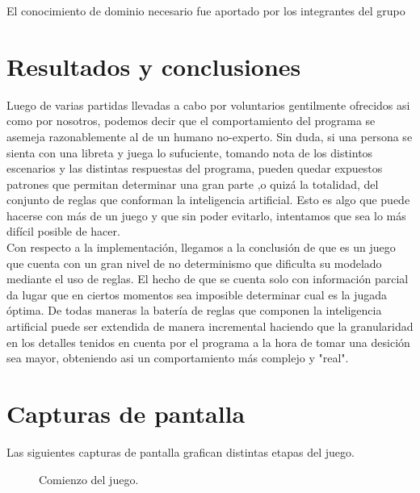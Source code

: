 \documentclass[12pt,a4paper]{article}
\begin{document}
El conocimiento de dominio necesario fue aportado por los integrantes del grupo 

\section{Resultados y conclusiones}
Luego de varias partidas llevadas a cabo por voluntarios gentilmente ofrecidos asi como por nosotros,
podemos decir que el comportamiento del programa se asemeja razonablemente al de un humano no-experto. 
Sin duda, si una persona se sienta con una libreta y juega lo sufuciente, tomando nota de los distintos escenarios y las
distintas respuestas del programa, pueden quedar expuestos patrones que permitan determinar una gran parte
,o quiz\'a la totalidad, del conjunto de reglas que conforman la inteligencia artificial. Esto es algo
que puede hacerse con m\'as de un juego y que sin poder evitarlo, intentamos que sea lo m\'as dif\'icil
posible de hacer. \\
Con respecto a la implementaci\'on, llegamos a la conclusi\'on de que es un juego que cuenta con un 
gran nivel de no determinismo que dificulta su modelado mediante el uso de reglas. El hecho
de que se cuenta solo con informaci\'on parcial da lugar que en ciertos momentos sea imposible determinar 
cual es la jugada \'optima.
De todas maneras la bater\'ia de reglas que componen la inteligencia artificial puede ser extendida de 
manera incremental haciendo que la granularidad en los detalles tenidos en cuenta por el programa
a la hora de tomar una desici\'on sea mayor, obteniendo asi un comportamiento m\'as complejo 
y "real".

\section{Capturas de pantalla}
Las siguientes capturas de pantalla grafican distintas etapas del juego.

\begin{figure}
\noindent {}
\caption{Comienzo del juego.}
\end{figure}
\end{document}
